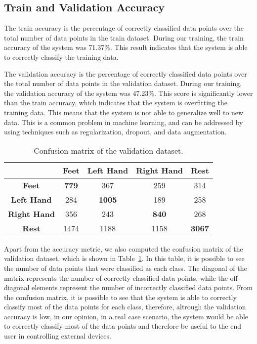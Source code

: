 \subsection*{Train and Validation Accuracy}
The train accuracy is the percentage of correctly classified data points over the total number of data points in the train dataset.
During our training, the train accuracy of the system was 71.37\%.
This result indicates that the system is able to correctly classify the training data.

The validation accuracy is the percentage of correctly classified data points over the total number of data points in the validation dataset.
During our training, the validation accuracy of the system was 47.23\%.
This score is significantly lower than the train accuracy, which indicates that the system is overfitting the training data.
This means that the system is not able to generalize well to new data.
This is a common problem in machine learning, and can be addressed by using techniques such as regularization, dropout, and data augmentation.

\begin{table}[!htbp]
    \centering
    \begin{tabular}{|c||c|c|c|c|}
        \hline
        & \textbf{Feet} & \textbf{Left Hand} & \textbf{Right Hand} & \textbf{Rest} \\
        \hline
        \hline
        \textbf{Feet} & \textbf{779} & 367 & 259 & 314 \\
        \hline
        \textbf{Left Hand} & 284 & \textbf{1005} & 189 & 258 \\
        \hline
        \textbf{Right Hand} & 356 & 243 & \textbf{840} & 268 \\
        \hline
        \textbf{Rest} & 1474 & 1188 & 1158 & \textbf{3067} \\
        \hline
    \end{tabular}
    \caption{Confusion matrix of the validation dataset.}\label{tab:confusion_matrix}
\end{table}

Apart from the accuracy metric, we also computed the confusion matrix of the validation dataset, which is shown in Table~\ref{tab:confusion_matrix}.
In this table, it is possible to see the number of data points that were classified as each class.
The diagonal of the matrix represents the number of correctly classified data points, while the off-diagonal elements represent the number of incorrectly classified data points.
From the confusion matrix, it is possible to see that the system is able to correctly classify most of the data points for each class, therefore, altrough the validation accuracy is low, in our opinion, in a real case scenario, the system would be able to correctly classify most of the data points and therefore be useful to the end user in controlling external devices.

